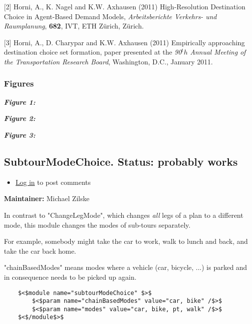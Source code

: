 \documentclass[a4paper,11pt]{report}
\begin{document}
[2] Horni, A., K. Nagel and K.W. Axhausen (2011) High-Resolution Destination Choice in Agent-Based Demand Models, \emph{Arbeitsberichte Verkehrs- und Raumplanung}, \textbf{682}, IVT, ETH Zürich, Zürich.

[3] Horni, A., D. Charypar and K.W. Axhausen (2011) Empirically  approaching destination choice set formation, paper presented at the \emph{90$^th$ Annual Meeting of the Transportation Research Board}, Washington, D.C., January 2011.

\subsubsection{Figures}

\emph{\textbf{Figure 1:}}






\emph{\textbf{Figure 2:}}





\emph{\textbf{Figure 3:}}








\subsection{SubtourModeChoice. Status: probably works}
\begin{itemize}
	\item \href{http://www.matsim.org/user/login?destination=comment/reply/477%23comment-form}{Log in} to post comments
\end{itemize}

\textbf{Maintainer:} Michael Zilske

In contrast to "ChangeLegMode", which changes \emph{all} legs of a plan to a different mode, this module changes the modes of sub-tours separately.

For example, somebody might take the car to work, walk to lunch and back, and take the car back home.

"chainBasedModes" means modes where a vehicle (car, bicycle,  ...) is parked and in consequence needs to be picked up again.
\begin{verbatim}
	$<$module name="subtourModeChoice" $>$
		$<$param name="chainBasedModes" value="car, bike" /$>$
		$<$param name="modes" value="car, bike, pt, walk" /$>$
	$<$/module$>$

\end{verbatim}
\end{document}
